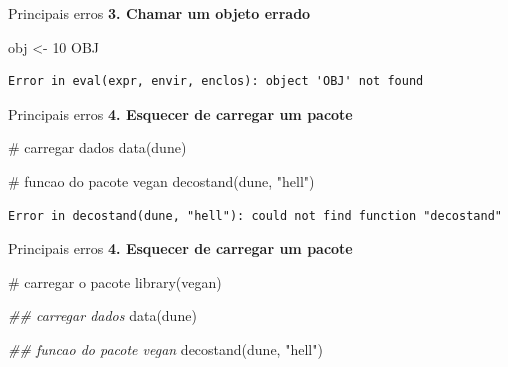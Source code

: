\documentclass[
  ignorenonframetext,
]{beamer}
\newenvironment{Shaded}{\begin{snugshade}}{\end{snugshade}}
\newcommand{\CommentTok}[1]{\textcolor[rgb]{0.37,0.37,0.37}{#1}}
\newcommand{\DecValTok}[1]{\textcolor[rgb]{0.68,0.00,0.00}{#1}}
\newcommand{\DocumentationTok}[1]{\textcolor[rgb]{0.37,0.37,0.37}{\textit{#1}}}
\newcommand{\FunctionTok}[1]{\textcolor[rgb]{0.28,0.35,0.67}{#1}}
\newcommand{\NormalTok}[1]{\textcolor[rgb]{0.00,0.23,0.31}{#1}}
\newcommand{\OtherTok}[1]{\textcolor[rgb]{0.00,0.23,0.31}{#1}}
\newcommand{\StringTok}[1]{\textcolor[rgb]{0.13,0.47,0.30}{#1}}
\begin{document}
\begin{frame}[fragile]{}
\begin{block}{Principais erros}
\textbf{3. Chamar um objeto errado}

\begin{Shaded}
\begin{Highlighting}[]
\NormalTok{obj }\OtherTok{\textless{}{-}} \DecValTok{10}
\NormalTok{OBJ}
\end{Highlighting}
\end{Shaded}

\begin{verbatim}
Error in eval(expr, envir, enclos): object 'OBJ' not found
\end{verbatim}
\end{block}

\begin{block}{Principais erros}
\protect\hypertarget{principais-erros-3}{}
\textbf{4. Esquecer de carregar um pacote}

\begin{Shaded}
\begin{Highlighting}[]
\CommentTok{\# carregar dados}
\FunctionTok{data}\NormalTok{(dune)}

\CommentTok{\# funcao do pacote vegan}
\FunctionTok{decostand}\NormalTok{(dune, }\StringTok{"hell"}\NormalTok{)}
\end{Highlighting}
\end{Shaded}

\begin{verbatim}
Error in decostand(dune, "hell"): could not find function "decostand"
\end{verbatim}
\end{block}

\begin{block}{Principais erros}
\protect\hypertarget{principais-erros-4}{}
\textbf{4. Esquecer de carregar um pacote}

\begin{Shaded}
\begin{Highlighting}[]
\CommentTok{\# carregar o pacote}
\FunctionTok{library}\NormalTok{(vegan)}

\DocumentationTok{\#\# carregar dados}
\FunctionTok{data}\NormalTok{(dune)}

\DocumentationTok{\#\# funcao do pacote vegan}
\FunctionTok{decostand}\NormalTok{(dune, }\StringTok{"hell"}\NormalTok{)}
\end{Highlighting}
\end{Shaded}


\end{block}
\end{frame}
\end{document}
